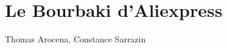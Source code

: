 \documentclass{article}
\begin{document}
\part*{Le Bourbaki d'Aliexpress}
Thomas Arocena, Constance Sarrazin
\tableofcontents
\pagebreak
\begin{multicols*}{2}





\pagebreak

\end{multicols*}
\end{document}

